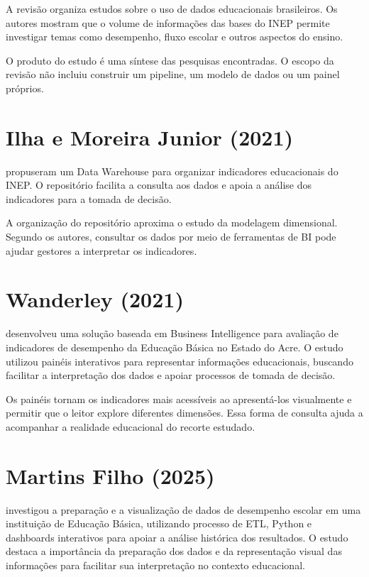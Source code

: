 A revisão organiza estudos sobre o uso de dados educacionais brasileiros. Os autores mostram que o volume de informações das bases do INEP permite investigar temas como desempenho, fluxo escolar e outros aspectos do ensino.

O produto do estudo é uma síntese das pesquisas encontradas. O escopo da revisão não incluiu construir um pipeline, um modelo de dados ou um painel próprios.

\section{Ilha e Moreira Junior (2021)}

 propuseram um Data Warehouse para organizar indicadores educacionais do INEP. O repositório facilita a consulta aos dados e apoia a análise dos indicadores para a tomada de decisão.

A organização do repositório aproxima o estudo da modelagem dimensional. Segundo os autores, consultar os dados por meio de ferramentas de BI pode ajudar gestores a interpretar os indicadores.

\section{Wanderley (2021)}

 desenvolveu uma solução baseada em Business Intelligence para avaliação de indicadores de desempenho da Educação Básica no Estado do Acre. O estudo utilizou painéis interativos para representar informações educacionais, buscando facilitar a interpretação dos dados e apoiar processos de tomada de decisão.

Os painéis tornam os indicadores mais acessíveis ao apresentá-los visualmente e permitir que o leitor explore diferentes dimensões. Essa forma de consulta ajuda a acompanhar a realidade educacional do recorte estudado.

\section{Martins Filho (2025)}

 investigou a preparação e a visualização de dados de desempenho escolar em uma instituição de Educação Básica, utilizando processo de ETL, Python e dashboards interativos para apoiar a análise histórica dos resultados. O estudo destaca a importância da preparação dos dados e da representação visual das informações para facilitar sua interpretação no contexto educacional.

